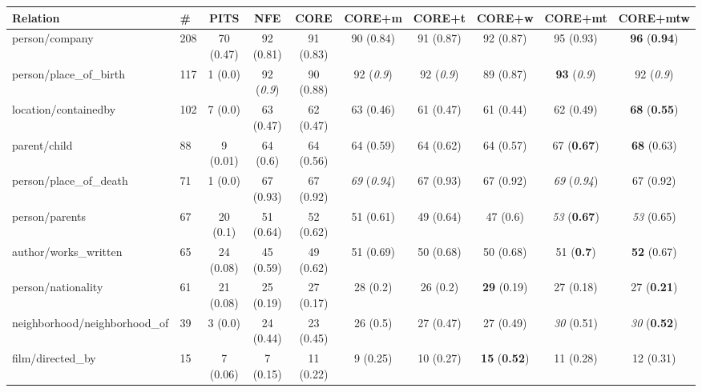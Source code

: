 
\begin{center}
\begin{tabular}{ l l | c c c c c c c c }
              Relation & \# & PITS & NFE & CORE & CORE+m & CORE+t & CORE+w & CORE+mt & CORE+mtw \\
\hline
person/company & 208 & 70 {\small (0.47) } & 92 {\small (0.81) } & 91 {\small (0.83) } & 90 {\small (0.84) } & 91 {\small (0.87) } & 92 {\small (0.87) } & 95 {\small (0.93) } & {\bf 96} {\small ({\bf 0.94}) }\\
person/place\_of\_birth & 117 & 1 {\small (0.0) } & 92 {\small ({\em0.9}) } & 90 {\small (0.88) } & 92 {\small ({\em0.9}) } & 92 {\small ({\em0.9}) } & 89 {\small (0.87) } & {\bf 93} {\small ({\em0.9}) } & 92 {\small ({\em0.9}) }\\
location/containedby & 102 & 7 {\small (0.0) } & 63 {\small (0.47) } & 62 {\small (0.47) } & 63 {\small (0.46) } & 61 {\small (0.47) } & 61 {\small (0.44) } & 62 {\small (0.49) } & {\bf 68} {\small ({\bf 0.55}) }\\
parent/child & 88 & 9 {\small (0.01) } & 64 {\small (0.6) } & 64 {\small (0.56) } & 64 {\small (0.59) } & 64 {\small (0.62) } & 64 {\small (0.57) } & 67 {\small ({\bf 0.67}) } & {\bf 68} {\small (0.63) }\\
person/place\_of\_death & 71 & 1 {\small (0.0) } & 67 {\small (0.93) } & 67 {\small (0.92) } & {\em69} {\small ({\em0.94}) } & 67 {\small (0.93) } & 67 {\small (0.92) } & {\em69} {\small ({\em0.94}) } & 67 {\small (0.92) }\\
person/parents & 67 & 20 {\small (0.1) } & 51 {\small (0.64) } & 52 {\small (0.62) } & 51 {\small (0.61) } & 49 {\small (0.64) } & 47 {\small (0.6) } & {\em53} {\small ({\bf 0.67}) } & {\em53} {\small (0.65) }\\
author/works\_written & 65 & 24 {\small (0.08) } & 45 {\small (0.59) } & 49 {\small (0.62) } & 51 {\small (0.69) } & 50 {\small (0.68) } & 50 {\small (0.68) } & 51 {\small ({\bf 0.7}) } & {\bf 52} {\small (0.67) }\\
person/nationality & 61 & 21 {\small (0.08) } & 25 {\small (0.19) } & 27 {\small (0.17) } & 28 {\small (0.2) } & 26 {\small (0.2) } & {\bf 29} {\small (0.19) } & 27 {\small (0.18) } & 27 {\small ({\bf 0.21}) }\\
neighborhood/neighborhood\_of & 39 & 3 {\small (0.0) } & 24 {\small (0.44) } & 23 {\small (0.45) } & 26 {\small (0.5) } & 27 {\small (0.47) } & 27 {\small (0.49) } & {\em30} {\small (0.51) } & {\em30} {\small ({\bf 0.52}) }\\
film/directed\_by & 15 & 7 {\small (0.06) } & 7 {\small (0.15) } & 11 {\small (0.22) } & 9 {\small (0.25) } & 10 {\small (0.27) } & {\bf 15} {\small ({\bf 0.52}) } & 11 {\small (0.28) } & 12 {\small (0.31) }\\

\end{tabular}
\end{center}

